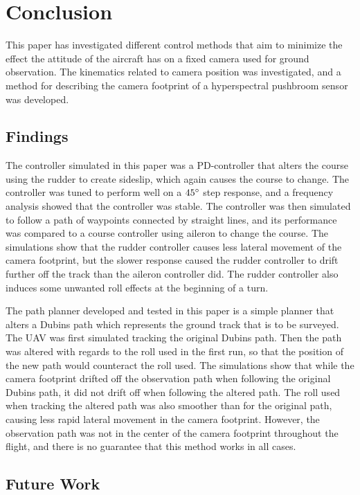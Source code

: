 \section{Conclusion}

This paper has investigated different control methods that aim to minimize the effect the attitude of the aircraft has on a fixed camera used for ground observation. The kinematics related to camera position was investigated, and a method for describing the camera footprint of a hyperspectral pushbroom sensor was developed.


\subsection{Findings}
The controller simulated in this paper was a PD-controller that alters the course using the rudder to create sideslip, which again causes the course to change. The controller was tuned to perform well on a $45\degree$ step response, and a frequency analysis showed that the controller was stable. The controller was then simulated to follow a path of waypoints connected by straight lines, and its performance was compared to a course controller using aileron to change the course. The simulations show that the rudder controller causes less lateral movement of the camera footprint, but the slower response caused the rudder controller to drift further off the track than the aileron controller did. The rudder controller also induces some unwanted roll effects at the beginning of a turn.

The path planner developed and tested in this paper is a simple planner that alters a Dubins path which represents the ground track that is to be surveyed. The UAV was first simulated tracking the original Dubins path. Then the path was altered with regards to the roll used in the first run, so that the position of the new path would counteract the roll used. The simulations show that while the camera footprint drifted off the observation path when following the original Dubins path, it did not drift off when following the altered path. The roll used when tracking the altered path was also smoother than for the original path, causing less rapid lateral movement in the camera footprint. However, the observation path was not in the center of the camera footprint throughout the flight, and there is no guarantee that this method works in all cases.


\subsection{Future Work}

